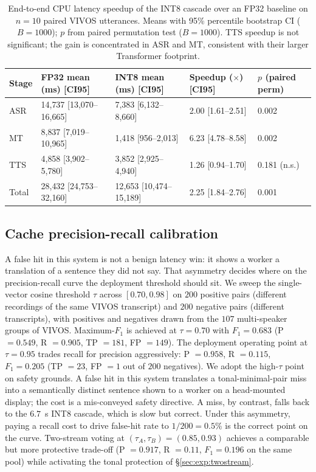 \documentclass[a4paper,fleqn]{cas-dc}
\begin{document}
\begin{table}[cols=5,pos=t]
\caption{End-to-end CPU latency speedup of the INT8 cascade over an FP32 baseline on $n=10$ paired VIVOS utterances. Means with 95\% percentile bootstrap CI ($B=1000$); $p$ from paired permutation test ($B=1000$). TTS speedup is not significant; the gain is concentrated in ASR and MT, consistent with their larger Transformer footprint.}\label{tab:latency}
\footnotesize
\begin{tabular*}{\tblwidth}{@{}LLLLL@{}}
\toprule
Stage & FP32 mean (ms) [CI95] & INT8 mean (ms) [CI95] & Speedup ($\times$) [CI95] & $p$ (paired perm) \\
\midrule
ASR   & 14{,}737 [13{,}070--16{,}665] & 7{,}383 [6{,}132--8{,}660]    & 2.00 [1.61--2.51] & 0.002 \\
MT    & 8{,}837 [7{,}019--10{,}965]   & 1{,}418 [956--2{,}013]        & 6.23 [4.78--8.58] & 0.002 \\
TTS   & 4{,}858 [3{,}902--5{,}780]    & 3{,}852 [2{,}925--4{,}940]    & 1.26 [0.94--1.70] & 0.181 (n.s.) \\
Total & 28{,}432 [24{,}753--32{,}160] & 12{,}653 [10{,}474--15{,}189] & 2.25 [1.84--2.76] & 0.001 \\
\bottomrule
\end{tabular*}
\end{table}

\subsection{Cache precision-recall calibration}\label{sec:exp:pr}

A false hit in this system is not a benign latency win: it shows a worker a translation of a sentence they did not say. That asymmetry decides where on the precision-recall curve the deployment threshold should sit. We sweep the single-vector cosine threshold $\tau$ across $[0.70, 0.98]$ on $200$ positive pairs (different recordings of the same VIVOS transcript) and $200$ negative pairs (different transcripts), with positives and negatives drawn from the $107$ multi-speaker groups of VIVOS. Maximum-$F_{1}$ is achieved at $\tau = 0.70$ with $F_{1} = 0.683$ (P $= 0.549$, R $= 0.905$, TP $= 181$, FP $= 149$). The deployment operating point at $\tau = 0.95$ trades recall for precision aggressively: P $= 0.958$, R $= 0.115$, $F_{1} = 0.205$ (TP $= 23$, FP $= 1$ out of $200$ negatives). We adopt the high-$\tau$ point on safety grounds. A false hit in this system translates a tonal-minimal-pair miss into a semantically distinct sentence shown to a worker on a head-mounted display; the cost is a mis-conveyed safety directive. A miss, by contrast, falls back to the $6.7$~s INT8 cascade, which is slow but correct. Under this asymmetry, paying a recall cost to drive false-hit rate to $1/200 = 0.5\%$ is the correct point on the curve. Two-stream voting at $(\tau_{A}, \tau_{B}) = (0.85, 0.93)$ achieves a comparable but more protective trade-off (P $= 0.917$, R $= 0.11$, $F_{1} = 0.196$ on the same pool) while activating the tonal protection of \S\ref{sec:exp:twostream}.
\end{document}
